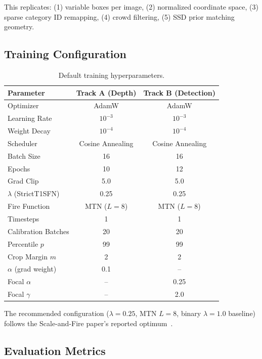 \documentclass[10pt,conference]{IEEEtran}
\begin{document}
This replicates: (1) variable boxes per image, (2) normalized coordinate space, (3) sparse category ID remapping, (4) crowd filtering, (5) SSD prior matching geometry.

\subsection{Training Configuration}

\begin{table}[t]
\caption{Default training hyperparameters.}
\label{tab:hyperparams}
\centering
\begin{tabular}{lcc}
\toprule
Parameter & Track A (Depth) & Track B (Detection) \\
\midrule
Optimizer & AdamW & AdamW \\
Learning Rate & $10^{-3}$ & $10^{-3}$ \\
Weight Decay & $10^{-4}$ & $10^{-4}$ \\
Scheduler & Cosine Annealing & Cosine Annealing \\
Batch Size & 16 & 16 \\
Epochs & 10 & 12 \\
Grad Clip & 5.0 & 5.0 \\
$\lambda$ (StrictT1SFN) & 0.25 & 0.25 \\
Fire Function & MTN ($L=8$) & MTN ($L=8$) \\
Timesteps & 1 & 1 \\
Calibration Batches & 20 & 20 \\
Percentile $p$ & 99 & 99 \\
Crop Margin $m$ & 2 & 2 \\
$\alpha$ (grad weight) & 0.1 & -- \\
Focal $\alpha$ & -- & 0.25 \\
Focal $\gamma$ & -- & 2.0 \\
\bottomrule
\end{tabular}
\end{table}

The recommended configuration ($\lambda=0.25$, MTN $L=8$, binary $\lambda=1.0$ baseline) follows the Scale-and-Fire paper's reported optimum~\cite{kim2023scale}.

\subsection{Evaluation Metrics}
\end{document}
